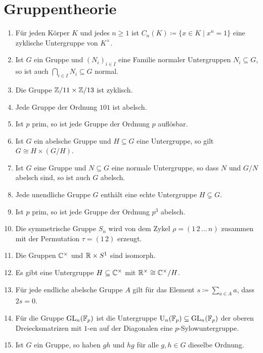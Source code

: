 \section{Gruppentheorie}


\begin{question}[subtitle = Wahr oder Falsch?]
  \begin{enumerate}
    \item
      Für jeden Körper $K$ und jedes $n \geq 1$ ist $C_n(K) \coloneqq \{x \in K \mid x^n = 1\}$ eine zyklische Untergruppe von $K^\times$.
    \item
      Ist $G$ ein Gruppe und $(N_i)_{i \in I}$ eine Familie normaler Untergruppen $N_i \subseteq G$, so ist auch $\bigcap_{i \in I} N_i \subseteq G$ normal.
    \item
      Die Gruppe $\mathbb{Z}/11 \times \mathbb{Z}/13$ ist zyklisch.
    \item
      Jede Gruppe der Ordnung $101$ ist abelsch.
    \item
      Ist $p$ prim, so ist jede Gruppe der Ordnung $p$ auflösbar.
    \item
      Ist $G$ ein abelsche Gruppe und $H \subseteq G$ eine Untergruppe, so gilt $G \cong H \times (G/H)$.
    \item
      Ist $G$ eine Gruppe und $N \subseteq G$ eine normale Untergruppe, so dass $N$ und $G/N$ abelsch sind, so ist auch $G$ abelsch.
    \item
      Jede unendliche Gruppe $G$ enthält eine echte Untergruppe $H \subsetneq G$.
    \item
      Ist $p$ prim, so ist jede Gruppe der Ordnung $p^3$ abelsch.
    \item
      Die symmetrische Gruppe $S_n$ wird von dem Zykel $\rho = (1 \, 2 \, \dotso \, n)$ zusammen mit der Permutation $\tau = (1 \, 2)$ erzeugt.
    \item
      Die Gruppen $\mathbb{C}^\times$ und $\mathbb{R} \times S^1$ sind isomorph.
    \item
      Es gibt eine Untergruppe $H \subseteq \mathbb{C}^\times$ mit $\mathbb{R}^\times \cong \mathbb{C}^\times/H$.
    \item
      Für jede endliche abelsche Gruppe $A$ gilt für das Element $s \coloneqq \sum_{a \in A} a$, dass $2 s = 0$.
    \item
      Für die Gruppe $\operatorname{GL}_n(\mathbb{F}_p)$ ist die Untergruppe $\operatorname{U}_n(\mathbb{F}_p) \subseteq \operatorname{GL}_n(\mathbb{F}_p)$ der oberen Dreiecksmatrizen mit $1$-en auf der Diagonalen eine $p$-Sylow\-unter\-gruppe.
    \item
      Ist $G$ ein Gruppe, so haben $gh$ und $hg$ für alle $g, h \in G$ dieselbe Ordnung.
  \end{enumerate}
\end{question}



